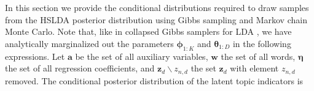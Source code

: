 
\label{sec:inference}

In this section we provide the conditional distributions required to draw samples from the HSLDA posterior distribution using Gibbs sampling and Markov chain Monte Carlo.  Note that, like in collapsed Gibbs samplers for LDA \cite{Griffiths04}, we have analytically marginalized out the parameters $\boldsymbol{\phi}_{1:K}$
and $\boldsymbol{\theta}_{1:D}$  in the following expressions.   Let $\mathbf{a}$ be the set of all auxiliary variables, $\mathbf{w}$  the set of all words, $\boldsymbol\eta$  the set of all regression coefficients, and  $\mathbf{z}_d\backslash z_{n,d}$  the set $\mathbf{z}_d$ with element $z_{n,d}$ removed.  The conditional posterior distribution of the latent topic indicators is
%
%
